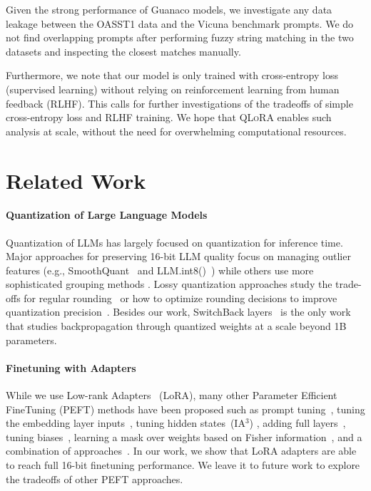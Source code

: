 Given the strong performance of {Guanaco} models, we investigate any data leakage between the OASST1 data and the Vicuna benchmark prompts. We do not find overlapping prompts after performing fuzzy string matching in the two datasets and inspecting the closest matches manually.

Furthermore, we note that our model is only trained with cross-entropy loss (supervised learning) without relying on reinforcement learning from human feedback (RLHF). This calls for further investigations of the tradeoffs of simple cross-entropy loss and RLHF training. We hope that \textsc{QLoRA} enables such analysis at scale, without the need for overwhelming computational resources.

\section{Related Work}

\paragraph{Quantization of Large Language Models} Quantization of LLMs has largely focused on quantization for inference time. Major approaches for preserving 16-bit LLM quality focus on managing outlier features (e.g., SmoothQuant~\citep{xiao2022smoothquant} and LLM.int8()~\citep{dettmers2022llm}) while others use more sophisticated grouping methods \citep{park2022nuqmm, yao2022zeroquant}. Lossy quantization approaches study the trade-offs for regular rounding~\citep{dettmers2022case,zeng2022glm,pope2022efficiently} or how to optimize rounding decisions to improve quantization precision~\citep{frantar2022gptq}. Besides our work, SwitchBack layers~\citep{wortsman2023stable} is the only work that studies backpropagation through quantized weights at a scale beyond 1B parameters.

\paragraph{Finetuning with Adapters} While we use Low-rank Adapters~\citep{hu2021lora} (LoRA), many other Parameter Efficient FineTuning (PEFT) methods have been proposed such as prompt tuning~\citep{qin2021learning,lester2021power,li2021prefix}, tuning the embedding layer inputs~\citep{an2022input}, tuning hidden states~(IA$^3$) \citep{liu2022few}, adding full layers~\citep{houlsby2019parameter}, tuning biases~\citep{zaken2021bitfit}, learning a mask over weights based on Fisher information~\citep{sung2021training}, and a combination of approaches~\citep{henderson2021compacter}. In our work, we show that LoRA adapters are able to reach full 16-bit finetuning performance. We leave it to future work to explore the tradeoffs of other PEFT approaches.

